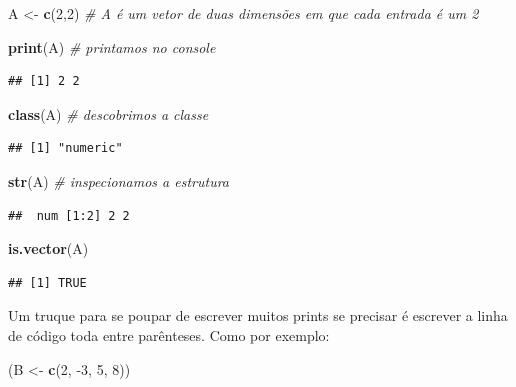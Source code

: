 \documentclass[
]{article}
\newenvironment{Shaded}{\begin{snugshade}}{\end{snugshade}}
\newcommand{\CommentTok}[1]{\textcolor[rgb]{0.56,0.35,0.01}{\textit{#1}}}
\newcommand{\DecValTok}[1]{\textcolor[rgb]{0.00,0.00,0.81}{#1}}
\newcommand{\KeywordTok}[1]{\textcolor[rgb]{0.13,0.29,0.53}{\textbf{#1}}}
\newcommand{\NormalTok}[1]{#1}
\newcommand{\StringTok}[1]{\textcolor[rgb]{0.31,0.60,0.02}{#1}}
\begin{document}
\begin{Shaded}
\begin{Highlighting}[]
\NormalTok{A <-}\StringTok{ }\KeywordTok{c}\NormalTok{(}\DecValTok{2}\NormalTok{,}\DecValTok{2}\NormalTok{) }\CommentTok{# A é um vetor de duas dimensões em que cada entrada é um 2}

\KeywordTok{print}\NormalTok{(A) }\CommentTok{# printamos no console}
\end{Highlighting}
\end{Shaded}

\begin{verbatim}
## [1] 2 2
\end{verbatim}

\begin{Shaded}
\begin{Highlighting}[]
\KeywordTok{class}\NormalTok{(A) }\CommentTok{# descobrimos a classe}
\end{Highlighting}
\end{Shaded}

\begin{verbatim}
## [1] "numeric"
\end{verbatim}

\begin{Shaded}
\begin{Highlighting}[]
\KeywordTok{str}\NormalTok{(A) }\CommentTok{# inspecionamos a estrutura}
\end{Highlighting}
\end{Shaded}

\begin{verbatim}
##  num [1:2] 2 2
\end{verbatim}

\begin{Shaded}
\begin{Highlighting}[]
\KeywordTok{is.vector}\NormalTok{(A)}
\end{Highlighting}
\end{Shaded}

\begin{verbatim}
## [1] TRUE
\end{verbatim}

Um truque para se poupar de escrever muitos prints se precisar é
escrever a linha de código toda entre parênteses. Como por exemplo:

\begin{Shaded}
\begin{Highlighting}[]
\NormalTok{(B <-}\StringTok{ }\KeywordTok{c}\NormalTok{(}\DecValTok{2}\NormalTok{, }\DecValTok{-3}\NormalTok{, }\DecValTok{5}\NormalTok{, }\DecValTok{8}\NormalTok{))}
\end{Highlighting}
\end{Shaded}
\end{document}
